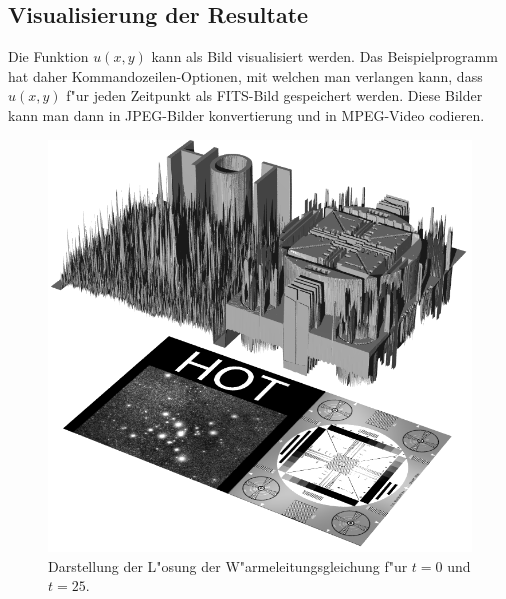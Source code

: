\subsection{Visualisierung der Resultate}
Die Funktion $u(x,y)$ kann als Bild visualisiert werden.
Das Beispielprogramm hat daher Kommandozeilen-Optionen, mit welchen man
verlangen kann, dass $u(x,y)$ f"ur jeden Zeitpunkt als FITS-Bild
gespeichert werden. Diese Bilder kann man dann in JPEG-Bilder konvertierung
und in MPEG-Video codieren.
\begin{figure}
\begin{center}
\includegraphics[width=\hsize]{heat/heat-i00000.png}
\end{center}
\caption{Darstellung der L"osung der W"armeleitungsgleichung
f"ur $t=0$ und $t=25$.
\label{heat:t0}}
\end{figure}
%
